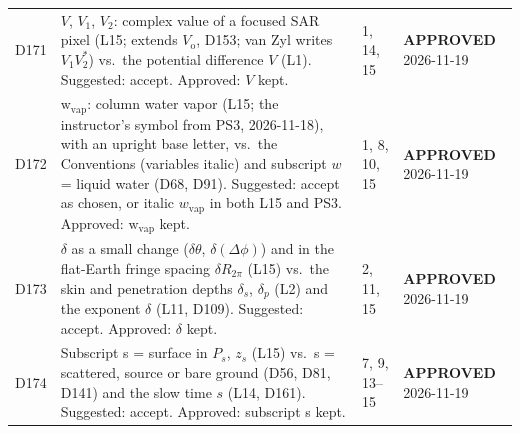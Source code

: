 \documentclass[11pt, oneside]{article}
\newcommand{\approved}{\textbf{APPROVED}}
\begin{document}
\begin{longtable}{l >{\raggedright\arraybackslash}p{} l l}
D171 & $V$, $V_1$, $V_2$: complex value of a focused SAR pixel (L15; extends $V_\mathrm{o}$, D153; van Zyl writes $V_1V_2^*$) vs.\ the potential difference $V$ (L1). Suggested: accept. Approved: $V$ kept. & 1, 14, 15 & \approved{} 2026-11-19 \\
D172 & $\mathrm{w_{vap}}$: column water vapor (L15; the instructor's symbol from PS3, 2026-11-18), with an upright base letter, vs.\ the Conventions (variables italic) and subscript $w$ = liquid water (D68, D91). Suggested: accept as chosen, or italic $w_\mathrm{vap}$ in both L15 and PS3. Approved: $\mathrm{w_{vap}}$ kept. & 1, 8, 10, 15 & \approved{} 2026-11-19 \\
D173 & $\delta$ as a small change ($\delta\theta$, $\delta(\Delta\phi)$) and in the flat-Earth fringe spacing $\delta R_{2\pi}$ (L15) vs.\ the skin and penetration depths $\delta_s$, $\delta_p$ (L2) and the exponent $\delta$ (L11, D109). Suggested: accept. Approved: $\delta$ kept. & 2, 11, 15 & \approved{} 2026-11-19 \\
D174 & Subscript s = surface in $P_s$, $z_s$ (L15) vs.\ s = scattered, source or bare ground (D56, D81, D141) and the slow time $s$ (L14, D161). Suggested: accept. Approved: subscript s kept. & 7, 9, 13--15 & \approved{} 2026-11-19 \\
\hline
\end{longtable}
\end{document}
